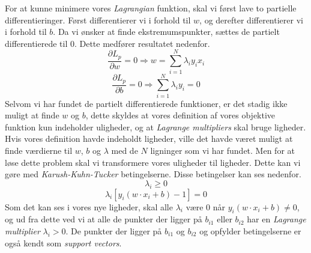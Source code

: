 \documentclass{article}
\begin{document}
For at kunne minimere vores \textit{Lagrangian} funktion, skal vi først lave to partielle differentieringer. Først differentierer vi i forhold til $w$, og derefter differentierer vi i forhold til $b$. Da vi ønsker at finde ekstremumspunkter, sættes de partielt differentierede til 0. Dette medfører resultatet nedenfor.
\begin{equation}
\label{eq:partial_L_pw}
\frac{\partial L_p}{\partial w} = 0 \Rightarrow w = \sum\limits_{i=1}^N \lambda_i y_i x_i
\end{equation}
\begin{equation}
\label{eq:partial_L_pb}
\frac{\partial L_p}{\partial b} = 0 \Rightarrow \sum\limits_{i=1}^N \lambda_i y_i = 0
\end{equation}
Selvom vi har fundet de partielt differentierede funktioner, er det stadig ikke muligt at finde $w$ og $b$, dette skyldes at vores definition af vores objektive funktion kun indeholder uligheder, og at \textit{Lagrange multipliers} skal bruge ligheder. Hvis vores definition havde indeholdt ligheder, ville det havde været muligt at finde værdierne til $w$, $b$ og $\lambda$ med de $N$ ligninger som vi har fundet. Men for at løse dette problem skal vi transformere vores uligheder til ligheder. Dette kan vi gøre med \textit{Karush-Kuhn-Tucker} betingelserne. Disse betingelser kan ses nedenfor.
\begin{equation}
\label{eq:constraint_lambda_i1}
\lambda_i \geq 0
\end{equation}
\begin{equation}
\label{eq:constraint_lambda_i2}
\lambda_i[y_i(w \cdot x_i + b) - 1] = 0
\end{equation}
Som det kan ses i vores nye ligheder, skal alle $\lambda_i$ være $0$ når $y_i(w \cdot x_i + b) \neq 0$, og ud fra dette ved vi at alle de punkter der ligger på $b_{i1}$ eller $b_{i2}$ har en \textit{Lagrange multiplier} $\lambda_i > 0$.  De punkter der ligger på $b_{i1}$ og $b_{i2}$ og opfylder betingelserne er også kendt som \textit{support vectors}.
\end{document}
